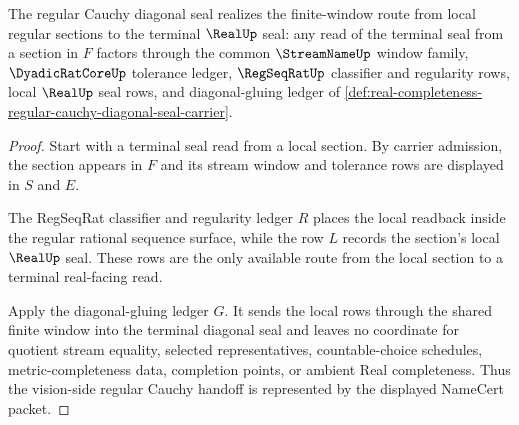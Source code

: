 \begin{theorem}
\label{thm:real-completeness-regular-cauchy-diagonal-seal-vision-handoff}
The regular Cauchy diagonal seal realizes the finite-window route from local regular sections to the terminal $\RealUp$ seal: any read of the terminal seal from a section in $F$ factors through the common $\StreamNameUp$ window family, $\DyadicRatCoreUp$ tolerance ledger, $\RegSeqRatUp$ classifier and regularity rows, local $\RealUp$ seal rows, and diagonal-gluing ledger of \autoref{def:real-completeness-regular-cauchy-diagonal-seal-carrier}.
\end{theorem}
\begin{proof}
Start with a terminal seal read from a local section. By carrier admission, the section appears in $F$ and its stream window and tolerance rows are displayed in $S$ and $E$.

The RegSeqRat classifier and regularity ledger $R$ places the local readback inside the regular rational sequence surface, while the row $L$ records the section's local $\RealUp$ seal. These rows are the only available route from the local section to a terminal real-facing read.

Apply the diagonal-gluing ledger $G$. It sends the local rows through the shared finite window into the terminal diagonal seal and leaves no coordinate for quotient stream equality, selected representatives, countable-choice schedules, metric-completeness data, completion points, or ambient Real completeness. Thus the vision-side regular Cauchy handoff is represented by the displayed NameCert packet.
\end{proof}


\begin{closurestatus}{\RegularCauchyDiagonalSealUp}
  \theoryclosure{\seedClosure}
  \formalstatus{\unformalizedV}
\end{closurestatus}
